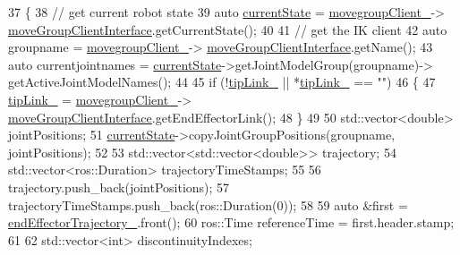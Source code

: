 \begin{DoxyCode}
37     \{
38         \textcolor{comment}{// get current robot state}
39         \textcolor{keyword}{auto} \hyperlink{classsmacc_1_1ISmaccClientBehavior_a5a6658a2deb72b700ae595e594617616}{currentState} = \hyperlink{classcl__move__group__interface_1_1CbMoveEndEffectorTrajectory_aea650d3e7836125b32be97392b71a7f3}{movegroupClient\_}->
      \hyperlink{classcl__move__group__interface_1_1ClMoveGroup_a92922ea689e4e1b7b91512c56629c95b}{moveGroupClientInterface}.getCurrentState();
40 
41         \textcolor{comment}{// get the IK client}
42         \textcolor{keyword}{auto} groupname = \hyperlink{classcl__move__group__interface_1_1CbMoveEndEffectorTrajectory_aea650d3e7836125b32be97392b71a7f3}{movegroupClient\_}->
      \hyperlink{classcl__move__group__interface_1_1ClMoveGroup_a92922ea689e4e1b7b91512c56629c95b}{moveGroupClientInterface}.getName();
43         \textcolor{keyword}{auto} currentjointnames = \hyperlink{classsmacc_1_1ISmaccClientBehavior_a5a6658a2deb72b700ae595e594617616}{currentState}->getJointModelGroup(groupname)->
      getActiveJointModelNames();
44 
45         \textcolor{keywordflow}{if} (!\hyperlink{classcl__move__group__interface_1_1CbMoveEndEffectorTrajectory_a24c6c30b9b0761a61fa002d947bd3e11}{tipLink\_} || *\hyperlink{classcl__move__group__interface_1_1CbMoveEndEffectorTrajectory_a24c6c30b9b0761a61fa002d947bd3e11}{tipLink\_} == \textcolor{stringliteral}{""})
46         \{
47             \hyperlink{classcl__move__group__interface_1_1CbMoveEndEffectorTrajectory_a24c6c30b9b0761a61fa002d947bd3e11}{tipLink\_} = \hyperlink{classcl__move__group__interface_1_1CbMoveEndEffectorTrajectory_aea650d3e7836125b32be97392b71a7f3}{movegroupClient\_}->
      \hyperlink{classcl__move__group__interface_1_1ClMoveGroup_a92922ea689e4e1b7b91512c56629c95b}{moveGroupClientInterface}.getEndEffectorLink();
48         \}
49 
50         std::vector<double> jointPositions;
51         \hyperlink{classsmacc_1_1ISmaccClientBehavior_a5a6658a2deb72b700ae595e594617616}{currentState}->copyJointGroupPositions(groupname, jointPositions);
52 
53         std::vector<std::vector<double>> trajectory;
54         std::vector<ros::Duration> trajectoryTimeStamps;
55 
56         trajectory.push\_back(jointPositions);
57         trajectoryTimeStamps.push\_back(ros::Duration(0));
58 
59         \textcolor{keyword}{auto} &first = \hyperlink{classcl__move__group__interface_1_1CbMoveEndEffectorTrajectory_ae13dfd31ea3660646e03882f0c2c29f0}{endEffectorTrajectory\_}.front();
60         ros::Time referenceTime = first.header.stamp;
61 
62         std::vector<int> discontinuityIndexes;

\end{DoxyCode}
